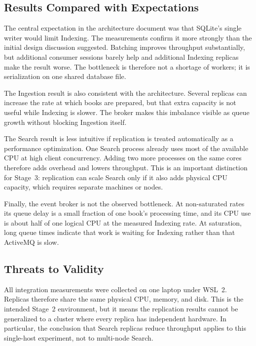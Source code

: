 \documentclass[12pt,a4paper]{article}
\begin{document}
\subsection{Results Compared with Expectations}

The central expectation in the architecture document was that SQLite's single writer would limit
Indexing. The measurements confirm it more strongly than the initial design discussion suggested.
Batching improves throughput substantially, but additional consumer sessions barely help and
additional Indexing replicas make the result worse. The bottleneck is therefore not a shortage of
workers; it is serialization on one shared database file.

The Ingestion result is also consistent with the architecture. Several replicas can increase the
rate at which books are prepared, but that extra capacity is not useful while Indexing is slower.
The broker makes this imbalance visible as queue growth without blocking Ingestion itself.

The Search result is less intuitive if replication is treated automatically as a performance
optimization. One Search process already uses most of the available CPU at high client
concurrency. Adding two more processes on the same cores therefore adds overhead and lowers
throughput. This is an important distinction for Stage~3: replication can scale Search only if it
also adds physical CPU capacity, which requires separate machines or nodes.

Finally, the event broker is not the observed bottleneck. At non-saturated rates its queue delay is
a small fraction of one book's processing time, and its CPU use is about half of one logical CPU at
the measured Indexing rate. At saturation, long queue times indicate that work is waiting for
Indexing rather than that ActiveMQ is slow.

\subsection{Threats to Validity}
\label{sec:threats}

All integration measurements were collected on one laptop under WSL~2. Replicas therefore share
the same physical CPU, memory, and disk. This is the intended Stage~2 environment, but it means the
replication results cannot be generalized to a cluster where every replica has independent
hardware. In particular, the conclusion that Search replicas reduce throughput applies to this
single-host experiment, not to multi-node Search.
\end{document}
